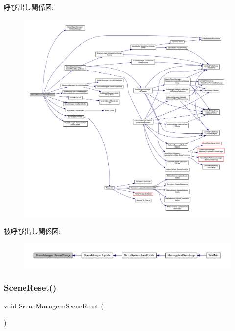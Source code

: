 呼び出し関係図\+:
\nopagebreak
\begin{figure}[H]
\begin{center}
\leavevmode
\includegraphics[width=350pt]{class_scene_manager_ab1ffc5d84cf812e4105cba755d034770_cgraph}
\end{center}
\end{figure}
被呼び出し関係図\+:
\nopagebreak
\begin{figure}[H]
\begin{center}
\leavevmode
\includegraphics[width=350pt]{class_scene_manager_ab1ffc5d84cf812e4105cba755d034770_icgraph}
\end{center}
\end{figure}
\mbox{\label{class_scene_manager_a0652a81c7baff52add9ec4b13205865c}} 
\subsubsection{\texorpdfstring{Scene\+Reset()}{SceneReset()}}
{\footnotesize\ttfamily void Scene\+Manager\+::\+Scene\+Reset (\begin{DoxyParamCaption}{ }\end{DoxyParamCaption})\hspace{0.3cm}{\ttfamily [private]}}




